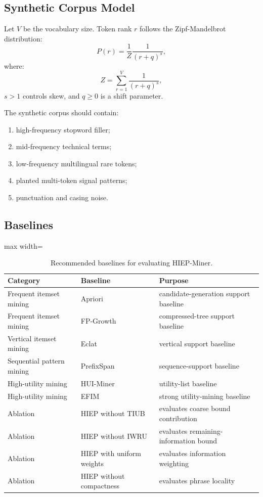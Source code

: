 \documentclass[11pt,a4paper]{article}
\begin{document}
\subsection{Synthetic Corpus Model}

Let \(V\) be the vocabulary size. Token rank \(r\) follows the Zipf-Mandelbrot distribution:
\[
P(r)=
\frac{1}{Z}
\frac{1}{(r+q)^s},
\]
where:
\[
Z=\sum_{r=1}^{V}\frac{1}{(r+q)^s},
\]
\(s>1\) controls skew, and \(q\ge0\) is a shift parameter.

The synthetic corpus should contain:

\begin{enumerate}[label=(\arabic*)]
    \item high-frequency stopword filler;
    \item mid-frequency technical terms;
    \item low-frequency multilingual rare tokens;
    \item planted multi-token signal patterns;
    \item punctuation and casing noise.
\end{enumerate}

\subsection{Baselines}

\begin{table}[H]
\centering
\caption{Recommended baselines for evaluating HIEP-Miner.}
\label{tab:baselines}
\small
\begin{adjustbox}{max width=\textwidth}
\begin{tabular}{lll}
\toprule
Category & Baseline & Purpose \\
\midrule
Frequent itemset mining & Apriori & candidate-generation support baseline \\
Frequent itemset mining & FP-Growth & compressed-tree support baseline \\
Vertical itemset mining & Eclat & vertical support baseline \\
Sequential pattern mining & PrefixSpan & sequence-support baseline \\
High-utility mining & HUI-Miner & utility-list baseline \\
High-utility mining & EFIM & strong utility-mining baseline \\
Ablation & HIEP without TIUB & evaluates coarse bound contribution \\
Ablation & HIEP without IWRU & evaluates remaining-information bound \\
Ablation & HIEP with uniform weights & evaluates information weighting \\
Ablation & HIEP without compactness & evaluates phrase locality \\
\bottomrule
\end{tabular}
\end{adjustbox}
\end{table}
\end{document}
